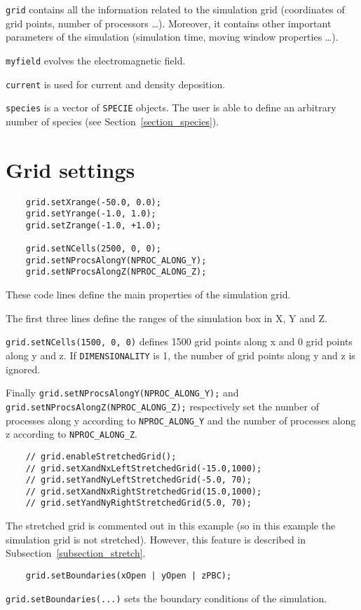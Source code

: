 \documentclass[11pt,a4paper]{report}
\begin{document}
\verb+grid+ contains all the information related to the simulation grid (coordinates of grid points, number of processors \ldots). Moreover, it contains other important parameters of the simulation (simulation time, moving window properties \ldots).

\verb+myfield+ evolves the electromagnetic field.

\verb+current+ is used for current and density deposition.

\verb+species+ is a vector of \verb+SPECIE+ objects. The user is able to define an arbitrary number of species (see Section~\ref{section_species}).


\section{Grid settings}
\begin{lstlisting}
	grid.setXrange(-50.0, 0.0);
	grid.setYrange(-1.0, 1.0);
	grid.setZrange(-1.0, +1.0);

	grid.setNCells(2500, 0, 0);
	grid.setNProcsAlongY(NPROC_ALONG_Y);
	grid.setNProcsAlongZ(NPROC_ALONG_Z);
\end{lstlisting}
These code lines define the main properties of the simulation grid.

The first three lines define the ranges of the simulation box in X, Y and Z.

\verb+grid.setNCells(1500, 0, 0)+ defines 1500 grid points along x and 0 grid points along y and z. If \verb+DIMENSIONALITY+ is 1, the number of grid points along y and z is ignored.

Finally \verb+grid.setNProcsAlongY(NPROC_ALONG_Y);+ and \verb+grid.setNProcsAlongZ(NPROC_ALONG_Z);+ respectively set the number of processes along y according to \verb+NPROC_ALONG_Y+ and the number of processes along z according to \verb+NPROC_ALONG_Z+.
\begin{lstlisting}
	// grid.enableStretchedGrid();
	// grid.setXandNxLeftStretchedGrid(-15.0,1000);
	// grid.setYandNyLeftStretchedGrid(-5.0, 70);
	// grid.setXandNxRightStretchedGrid(15.0,1000);
	// grid.setYandNyRightStretchedGrid(5.0, 70);
\end{lstlisting}
The stretched grid is commented out in this example (so in this example the simulation grid is not stretched). However, this feature is described in Subsection~\ref{subsection_stretch}.
\begin{lstlisting}
	grid.setBoundaries(xOpen | yOpen | zPBC);
\end{lstlisting}
\verb+grid.setBoundaries(...)+ sets the boundary conditions of the simulation.
\end{document}
